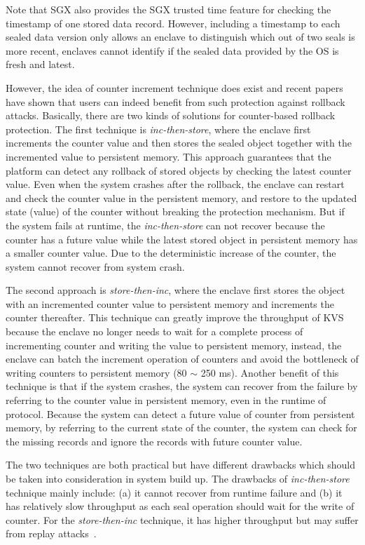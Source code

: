 Note that SGX also provides the SGX trusted time feature for checking the timestamp of one stored data record. However, including a timestamp to each sealed data version only allows an enclave to distinguish which out of two seals is more recent, enclaves cannot identify if the sealed data provided by the OS is fresh and latest.

However, the idea of counter increment technique does exist and recent papers~\cite{} have 
shown that users can indeed benefit from such protection against rollback attacks.
Basically, there are two kinds of solutions for counter-based rollback protection.
The first technique is \textit{inc-then-store}, where the enclave first increments the counter
value and then stores the sealed object together with the incremented value 
to persistent memory. This approach guarantees that the platform can detect any rollback 
of stored objects by checking the latest counter value. Even when the system crashes after 
the rollback, the enclave can restart and check the counter value in the persistent memory,
and restore to the updated state (value) of the counter without breaking the protection mechanism.
But if the system fails at runtime, the \textit{inc-then-store} can not recover because 
the counter has a future value while the latest stored object in persistent memory has a smaller 
counter value. Due to the deterministic increase of the counter, the system cannot recover from 
system crash.

The second approach is \textit{store-then-inc}, where the enclave first stores the object with 
an incremented counter value to persistent memory and increments the counter thereafter.
This technique can greatly improve the throughput of KVS because the enclave no longer needs to 
wait for a complete process of incrementing counter and writing the value to persistent memory,
instead, the enclave can batch the increment operation of counters and avoid the bottleneck 
of writing counters to persistent memory (80 $\sim$ 250 ms). Another benefit of this technique is 
that if the system crashes, the system can recover from the failure by referring to the counter 
value in persistent memory, even in the runtime of protocol. Because the system can detect a future 
value of counter from persistent memory, by referring to the current state of the counter, the 
system can check for the missing records and ignore the records with future counter value.

The two techniques are both practical but have different drawbacks which should be taken into 
consideration in system build up. The drawbacks of \textit{inc-then-store} technique mainly include: 
(a) it cannot recover from runtime failure and (b) it has relatively slow throughput as each seal operation 
should wait for the write of counter. For the \textit{store-then-inc} technique, it has higher throughput 
but may suffer from replay attacks~\cite{}. 
